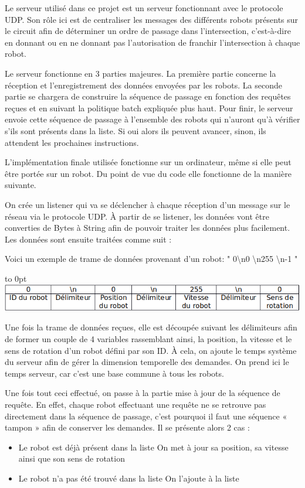 \documentclass[french,a4paper,12pt]{report}
\begin{document}
Le serveur utilisé dans ce projet est un serveur fonctionnant avec le protocole UDP. Son rôle ici est de centraliser les messages des différents robots présents sur le circuit afin de déterminer un ordre de passage dans l’intersection, c’est-à-dire en donnant ou en ne donnant pas l’autorisation de franchir l’intersection à chaque robot.

Le serveur fonctionne en 3 parties majeures. La première partie concerne la réception et l’enregistrement des données envoyées par les robots. La seconde partie se chargera de construire la séquence de passage en fonction des requêtes reçues et en suivant la politique batch expliquée plus haut. Pour finir, le serveur envoie cette séquence de passage à l’ensemble des robots qui n’auront qu’à vérifier s’ils sont présents dans la liste. Si oui alors ils peuvent avancer, sinon, ils attendent les prochaines instructions.

L’implémentation finale utilisée fonctionne sur un ordinateur, même si elle peut être portée sur un robot. Du point de vue du code elle fonctionne de la manière suivante.

On crée un listener qui va se déclencher à chaque réception d’un message sur le réseau via le protocole UDP. À partir de se listener, les données vont être converties de Bytes à String afin de pouvoir traiter les données plus facilement. Les données sont ensuite traitées comme suit :

Voici un exemple de trame de données provenant d’un robot: " 0\textbackslash n0 \textbackslash n255 \textbackslash n-1 " \newline

\hfill\hbox to 0pt{\hss\includegraphics[width=15cm]{val.png}\hss}\hfill\null\newline

Une fois la trame de données reçues, elle est découpée suivant les délimiteurs afin de former un couple de 4 variables rassemblant ainsi, la position, la vitesse et le sens de rotation d’un robot défini par son ID. À cela, on ajoute le temps système du serveur afin de gérer la dimension temporelle des demandes. On prend ici le temps serveur, car c’est une base commune à tous les robots.

Une fois tout ceci effectué, on passe à la partie mise à jour de la séquence de requête. En effet, chaque robot effectuant une requête ne se retrouve pas directement dans la séquence de passage, c’est pourquoi il faut une séquence « tampon » afin de conserver les demandes. Il se présente alors 2 cas :
\begin{itemize}
\item Le robot est déjà présent dans la liste
	On met à jour sa position, sa vitesse ainsi que son sens de rotation
	
\item Le robot n’a pas été trouvé dans la liste
	On l’ajoute à la liste
\end{itemize}
\end{document}
